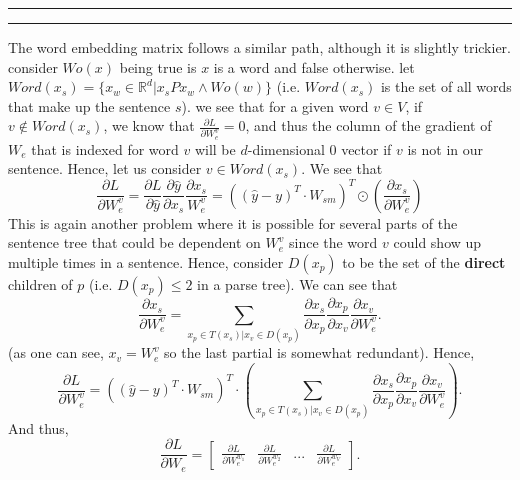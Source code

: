 \documentclass[11pt]{article}
\newcounter{questionCounter}
\newcounter{partCounter}[questionCounter]
\newenvironment{question}[2][\arabic{questionCounter}]{%
    \addtocounter{questionCounter}{1}%
    \setcounter{partCounter}{0}%
    \vspace{.25in} \hrule \vspace{0.5em}%
        \noindent{\bf #2}%
    \vspace{0.8em} \hrule \vspace{.10in}%
}{}
\begin{document}
\begin{question}{Word Embedding Matrix}
The word embedding matrix follows a similar path, although it is slightly
trickier. consider $Wo(x)$ being true is $x$ is a word and false otherwise.
let $Word(x_s) = \{x_w \in \mathbb{R}^d | x_sPx_w \wedge Wo(w)\}$
(i.e. $Word(x_s)$ is the set of all words that make up the sentence $s$).
we see that for a given word $v \in V$, if $v \notin Word(x_s)$, we know that
$\frac{\partial L}{\partial W_e^v} = 0$,
and thus the column of the gradient of $W_e$ that is indexed for word $v$ will 
be $d$-dimensional $0$ vector if $v$ is not in our sentence. Hence, let us
consider $v \in Word(x_s).$ We see that
$$\frac{\partial L}{\partial W_e^v}
= \frac{\partial L}{\partial \hat{y}}
\frac{\partial \hat{y}}{\partial x_s}
\frac{\partial x_s}{W_e^v}
= ((\hat{y}-y)^T \cdot W_{sm})^T \odot
(\frac{\partial x_s}{\partial W_e^v})$$
This is again another problem where it is possible for several parts of
the sentence tree that could be dependent on $W_e^v$ since the word $v$ could
show up multiple times in a sentence. Hence, consider $D(x_p)$ to be the set
of the \textbf{direct} children of $p$ (i.e. $D(x_p) \leq 2$ in a parse tree).
We can see that
$$\frac{\partial x_s}{\partial W_e^v}
= \sum_{x_p \in T(x_s) | x_v \in D(x_p)}
\frac{\partial x_s}{\partial x_p} \frac{\partial x_p}{\partial x_v}
\frac{\partial x_v}{\partial W_e^v}.$$
(as one can see, $x_v = W_e^v$ so the last partial is somewhat redundant).
Hence,
$$\frac{\partial L}{\partial W_e^v}
= ((\hat{y}-y)^T \cdot W_{sm})^T \cdot
\left(\sum_{x_p  \in T(x_s) | x_v \in D(x_p)}
    \frac{\partial x_s}{\partial x_p}\frac{\partial x_p}{\partial x_v}
\frac{\partial x_v}{\partial W_e^v}\right).$$
And thus,
$$\frac{\partial L}{\partial W_e}
= \left[\begin{array}{cccc} \frac{\partial L}{\partial W_e^{w_1}}
        &\frac{\partial L}{\partial W_e^{w_2}}&
...&\frac{\partial L}{\partial W_e^{w_V}} \end{array}\right].$$
\end{question}
\end{document}
